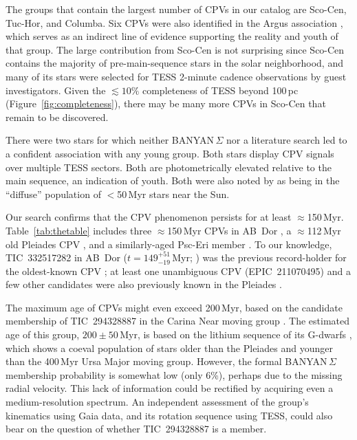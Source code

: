 \documentclass[11pt,twocolumn,tighten]{aastex63}
\begin{document}
The groups that contain the largest number of CPVs in our catalog are
Sco-Cen, Tuc-Hor, and Columba.  Six CPVs were also identified in the
Argus association \citep{2019ApJ...870...27Z}, which serves as an
indirect line of evidence supporting the reality and youth of that
group.  The large contribution from Sco-Cen is not surprising since
Sco-Cen contains the majority of pre-main-sequence stars in the solar
neighborhood, and many of its stars were selected for TESS 2-minute
cadence observations by guest investigators.  Given the
$\lesssim$$10\%$ completeness of TESS beyond 100\,pc
(Figure~\ref{fig:completeness}), there may be many more CPVs in
Sco-Cen that remain to be discovered.

There were two stars for which neither BANYAN\,$\Sigma$ nor a
literature search led to a confident association with any young group.
Both stars display CPV signals over multiple TESS sectors. Both are
photometrically elevated relative to the main sequence, an indication
of youth.  Both were also noted by \citet{2021ApJ...917...23K} as
being in the ``diffuse'' population of $<$50\,Myr stars near the Sun.

Our search confirms that the CPV phenomenon persists for at least
$\approx$150\,Myr.  Table~\ref{tab:thetable} includes three
$\approx$150\,Myr CPVs in AB~Dor \citep{2015MNRAS.454..593B}, a
$\approx$112\,Myr old Pleiades CPV \citep{2015ApJ...813..108D}, and a
similarly-aged Psc-Eri member \citep{2020A&A...639A..64R}.  To our
knowledge, TIC~332517282 in AB~Dor ($t$$=$$149^{+51}_{-19}$\,Myr;
\citealt{2015MNRAS.454..593B}) was the previous record-holder for the
oldest-known CPV \citep{2019ApJ...876..127Z,2022AJ....163..144G}; at
least one unambiguous CPV (EPIC~211070495) and a few other candidates
were also previously known in the Pleiades
\citep{2016AJ....152..114R}.  

The maximum age of CPVs might even exceed 200\,Myr, based on the
candidate membership of TIC~294328887 in the Carina Near moving group
\citep{2006ApJ...649L.115Z}.  The estimated age of this group, $200
\pm 50$\,Myr, is based on the lithium sequence of its G-dwarfs
\citep{2006ApJ...649L.115Z}, which shows a coeval population of stars
older than the Pleiades and younger than the 400\,Myr Ursa Major
moving group.  However, the formal BANYAN\,$\Sigma$ membership
probability is somewhat low (only 6\%), perhaps due to the missing
radial velocity.  This lack of information could be rectified by
acquiring even a medium-resolution spectrum.  An independent
assessment of the group's kinematics using Gaia data, and its rotation
sequence using TESS, could also bear on the question of whether
TIC~294328887 is a member.
\end{document}

